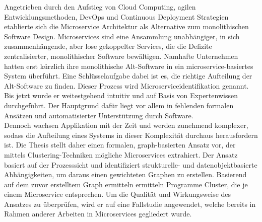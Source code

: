 
\Abstract
Angetrieben durch den Aufstieg von Cloud Computing, agilen Entwicklungsmethoden, DevOps und Continuous Deployment Strategien etablierte sich die Microservice Architektur als Alternative zum monolithischen Software Design. Microservices sind eine Ansammlung unabhängiger, in sich zusammenhängende, aber lose gekoppelter Services, die die Defizite zentralisierter, monolithischer Software bewältigen. Namhafte Unternehmen hatten erst kürzlich ihre monolithische Alt-Software in ein microservice-basiertes System überführt. Eine Schlüsselaufgabe dabei ist es, die richtige Aufteilung der Alt-Software zu finden. Dieser Prozess wird Microserviceidentifikation genannt. Bis jetzt wurde er weitestgehend intuitiv und auf Basis von Expertenwissen durchgeführt. Der Hauptgrund dafür liegt vor allem in fehlenden formalen Ansätzen und automatisierter Unterstützung durch Software.\\
Dennoch wachsen Applikation mit der Zeit und werden zunehmend komplexer, sodass die Aufteilung eines Systems in dieser Komplexität durchaus herausfordern ist. Die Thesis stellt daher einen formalen, graph-basierten Ansatz vor, der mittels Clustering-Techniken mögliche Microservices extrahiert. Der Ansatz basiert auf der Prozesssicht und identifiziert strukturelle- und datenobjektbasierte Abhängigkeiten, um daraus einen gewichteten Graphen zu erstellen. Basierend auf dem zuvor erstelltem Graph ermitteln ermitteln Programme Cluster, die je einem Microservice entsprechen. Um die Qualität und Wirkungsweise des Ansatzes zu überprüfen, wird er auf eine Fallstudie angewendet, welche bereits in Rahmen anderer Arbeiten in Microservices gegliedert wurde. 

